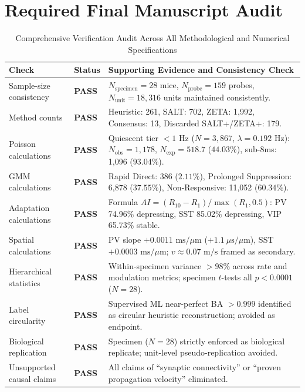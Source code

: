 \documentclass[10pt,journal,compsoc]{IEEEtran}
\begin{document}
\section*{Required Final Manuscript Audit}
\begin{table}[h]
\caption{Comprehensive Verification Audit Across All Methodological and Numerical Specifications}
\label{tab:audit}
\centering
\begin{tabularx}{\textwidth}{llX}
\toprule
\textbf{Check} & \textbf{Status} & \textbf{Supporting Evidence and Consistency Check} \\
\midrule
Sample-size consistency        & \textbf{PASS} & $N_{\text{specimen}}=28$ mice, $N_{\text{probe}}=159$ probes, $N_{\text{unit}}=18,316$ units maintained consistently. \\
Method counts                  & \textbf{PASS} & Heuristic: 261, SALT: 702, ZETA: 1,992, Consensus: 13, Discarded SALT+/ZETA+: 179. \\
Poisson calculations           & \textbf{PASS} & Quiescent tier $<1$ Hz ($N=3,867$, $\lambda=0.192$ Hz): $N_{\text{obs}}=1,178$, $N_{\text{exp}}=518.7$ ($44.03\%$), sub-8ms: 1,096 ($93.04\%$). \\
GMM calculations               & \textbf{PASS} & Rapid Direct: 386 ($2.11\%$), Prolonged Suppression: 6,878 ($37.55\%$), Non-Responsive: 11,052 ($60.34\%$). \\
Adaptation calculations        & \textbf{PASS} & Formula $AI = (R_{10} - R_1)/\max(R_1, 0.5)$: PV 74.96\% depressing, SST 85.02\% depressing, VIP 65.73\% stable. \\
Spatial calculations           & \textbf{PASS} & PV slope $+0.0011\text{ ms}/\mu\text{m}$ ($+1.1\ \mu\text{s}/\mu\text{m}$), SST $+0.0003\text{ ms}/\mu\text{m}$; $v \approx 0.07\text{ m/s}$ framed as secondary. \\
Hierarchical statistics        & \textbf{PASS} & Within-specimen variance $>98\%$ across rate and modulation metrics; specimen $t$-tests all $p < 0.0001$ ($N=28$). \\
Label circularity              & \textbf{PASS} & Supervised ML near-perfect BA $>0.999$ identified as circular heuristic reconstruction; avoided as endpoint. \\
Biological replication         & \textbf{PASS} & Specimen ($N=28$) strictly enforced as biological replicate; unit-level pseudo-replication avoided. \\
Unsupported causal claims      & \textbf{PASS} & All claims of ``synaptic connectivity'' or ``proven propagation velocity'' eliminated. \\
\bottomrule
\end{tabularx}
\end{table}
\end{document}
